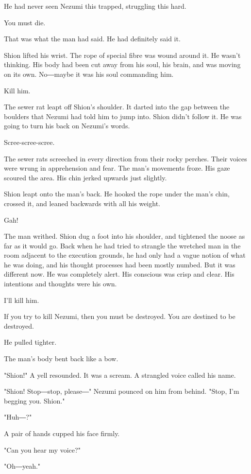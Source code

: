 He had never seen Nezumi this trapped, struggling this hard.

You must die.

That was what the man had said. He had definitely said it.

Shion lifted his wrist. The rope of special fibre was wound around it.
He wasn't thinking. His body had been cut away from his soul, his brain,
and was moving on its own. No―maybe it was his soul commanding him.

Kill him.

The sewer rat leapt off Shion's shoulder. It darted into the gap between
the boulders that Nezumi had told him to jump into. Shion didn't follow
it. He was going to turn his back on Nezumi's words.

Scree-scree-scree.

The sewer rats screeched in every direction from their rocky perches.
Their voices were wrung in apprehension and fear. The man's movements
froze. His gaze scoured the area. His chin jerked upwards just slightly.

Shion leapt onto the man's back. He hooked the rope under the man's
chin, crossed it, and leaned backwards with all his weight.

Gah!

The man writhed. Shion dug a foot into his shoulder, and tightened the
noose as far as it would go. Back when he had tried to strangle the
wretched man in the room adjacent to the execution grounds, he had only
had a vague notion of what he was doing, and his thought processes had
been mostly numbed. But it was different now. He was completely alert.
His conscious was crisp and clear. His intentions and thoughts were his
own.

I'll kill him.

If you try to kill Nezumi, then you must be destroyed. You are destined
to be destroyed.

He pulled tighter.

The man's body bent back like a bow.

"Shion!" A yell resounded. It was a scream. A strangled voice called his
name.

"Shion! Stop―stop, please―" Nezumi pounced on him from behind. "Stop,
I'm begging you. Shion."

"Huh―?"

A pair of hands cupped his face firmly.

"Can you hear my voice?"

"Oh―yeah."

